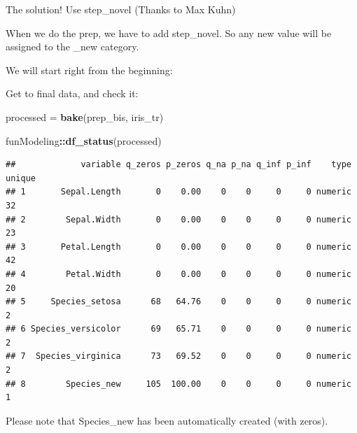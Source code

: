 \documentclass[]{article}
\newenvironment{Shaded}{\begin{snugshade}}{\end{snugshade}}
\newcommand{\KeywordTok}[1]{\textcolor[rgb]{0.13,0.29,0.53}{\textbf{#1}}}
\newcommand{\DataTypeTok}[1]{\textcolor[rgb]{0.13,0.29,0.53}{#1}}
\newcommand{\StringTok}[1]{\textcolor[rgb]{0.31,0.60,0.02}{#1}}
\newcommand{\OperatorTok}[1]{\textcolor[rgb]{0.81,0.36,0.00}{\textbf{#1}}}
\newcommand{\NormalTok}[1]{#1}
\begin{document}
The solution! Use step\_novel (Thanks to Max Kuhn)

When we do the prep, we have to add step\_novel. So any new value will
be assigned to the \_new category.

We will start right from the beginning:

\begin{Shaded}
\end{Shaded}

Get to final data, and check it:

\begin{Shaded}
\begin{Highlighting}[]
\NormalTok{processed =}\StringTok{ }\KeywordTok{bake}\NormalTok{(prep_bis, iris_tr)}

\NormalTok{funModeling}\OperatorTok{::}\KeywordTok{df_status}\NormalTok{(processed)}
\end{Highlighting}
\end{Shaded}

\begin{verbatim}
##             variable q_zeros p_zeros q_na p_na q_inf p_inf    type unique
## 1       Sepal.Length       0    0.00    0    0     0     0 numeric     32
## 2        Sepal.Width       0    0.00    0    0     0     0 numeric     23
## 3       Petal.Length       0    0.00    0    0     0     0 numeric     42
## 4        Petal.Width       0    0.00    0    0     0     0 numeric     20
## 5     Species_setosa      68   64.76    0    0     0     0 numeric      2
## 6 Species_versicolor      69   65.71    0    0     0     0 numeric      2
## 7  Species_virginica      73   69.52    0    0     0     0 numeric      2
## 8        Species_new     105  100.00    0    0     0     0 numeric      1
\end{verbatim}

Please note that Species\_new has been automatically created (with
zeros).
\end{document}
